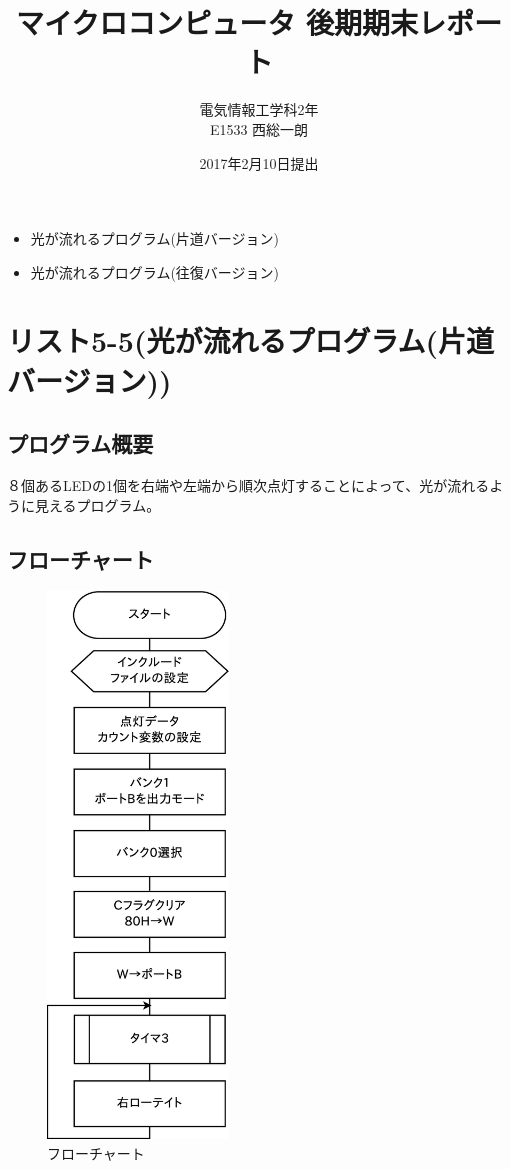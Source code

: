 \documentclass[a4paper,12pt]{ujarticle}
\begin{document}
\title{マイクロコンピュータ 後期期末レポート}
\author{電気情報工学科2年 \\ E1533 西総一朗}
\date{2017年2月10日提出}
\maketitle
\begin{itemize}
 \item 光が流れるプログラム(片道バージョン)
 \item 光が流れるプログラム(往復バージョン)
\end{itemize}
\clearpage
\tableofcontents
\clearpage
 \section{リスト5-5(光が流れるプログラム(片道バージョン))}
  \subsection{プログラム概要}
  ８個あるLEDの1個を右端や左端から順次点灯することによって、光が流れるように見えるプログラム。
  \subsection{フローチャート}
  \begin{figure}[htbp]
   \begin{center}
     \includegraphics[height=145mm]{Diagram5-5.eps}
   \end{center}
   \caption{フローチャート}
   \label{fig}
  \end{figure}
   \clearpage
\end{document}
